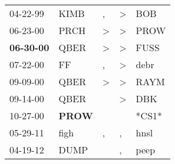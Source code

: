\begin{supertabular}{p{0.07\textwidth}p{0.06\textwidth}p{0.02\textwidth}p{0.02\textwidth}p{0.06\textwidth}}
          04-22-99\textsuperscript{} &           KIMB\textsuperscript{} &             , &  \textgreater &   BOB\textsuperscript{} \\
          06-23-00\textsuperscript{} &           PRCH\textsuperscript{} &  \textgreater &  \textgreater &  PROW\textsuperscript{} \\
 \textbf{06-30-00\textsuperscript{}} &           QBER\textsuperscript{} &  \textgreater &  \textgreater &  FUSS\textsuperscript{} \\
          07-22-00\textsuperscript{} &             FF\textsuperscript{} &             , &  \textgreater &  debr\textsuperscript{} \\
          09-09-00\textsuperscript{} &           QBER\textsuperscript{} &  \textgreater &  \textgreater &  RAYM\textsuperscript{} \\
          09-14-00\textsuperscript{} &           QBER\textsuperscript{} &               &  \textgreater &   DBK\textsuperscript{} \\
          10-27-00\textsuperscript{} &  \textbf{PROW\textsuperscript{}} &               &               &                   *CS1* \\
          05-29-11\textsuperscript{} &           figh\textsuperscript{} &             , &             , &  hnsl\textsuperscript{} \\
          04-19-12\textsuperscript{} &           DUMP\textsuperscript{} &               &             , &  peep\textsuperscript{} \\
\end{supertabular}
